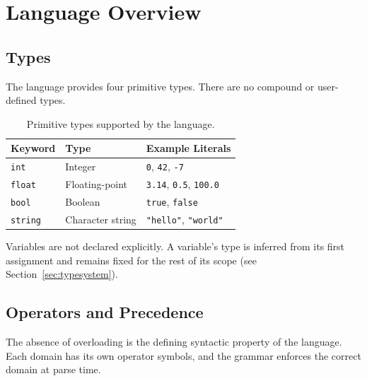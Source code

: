 \documentclass[12pt,a4paper]{report}
\begin{document}
\chapter{Language Overview}

\section{Types}

The language provides four primitive types. There are no compound or
user-defined types.

\begin{table}[H]
\centering
\caption{Primitive types supported by the language.}
\label{tab:types}
\begin{tabular}{llp{5cm}}
\toprule
\textbf{Keyword} & \textbf{Type} & \textbf{Example Literals} \\
\midrule
\texttt{int}    & Integer          & \texttt{0}, \texttt{42}, \texttt{-7} \\
\texttt{float}  & Floating-point   & \texttt{3.14}, \texttt{0.5}, \texttt{100.0} \\
\texttt{bool}   & Boolean          & \texttt{true}, \texttt{false} \\
\texttt{string} & Character string & \texttt{"hello"}, \texttt{"world"} \\
\bottomrule
\end{tabular}
\end{table}

Variables are not declared explicitly. A variable's type is inferred from its
first assignment and remains fixed for the rest of its scope (see
Section~\ref{sec:typesystem}).

\section{Operators and Precedence}

The absence of overloading is the defining syntactic property of the language.
Each domain has its own operator symbols, and the grammar enforces the correct
domain at parse time.
\end{document}
